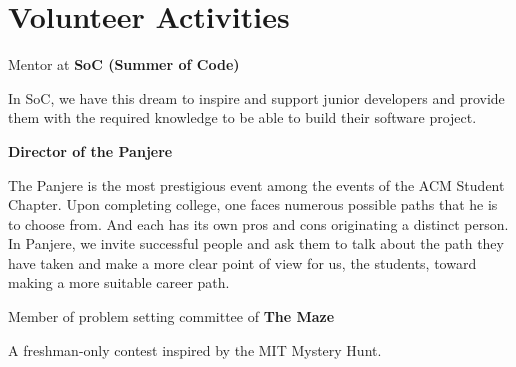 \documentclass[letterpaper]{article}
\renewenvironment{itemize}{
  \begin{list}{}{
    \setlength{\leftmargin}{1.5em}
  }
}{
  \end{list}
}
\begin{document}
\section*{Volunteer Activities}
\begin{itemize}
    \item \begin{samepage}\hspace*{10pt} Mentor at \textbf{SoC (Summer of Code)}
            \begin{description}[style=nextline,noitemsep,topsep=0pt]
                \item {\hspace*{10pt} In SoC, we have this dream to inspire and support junior developers and provide them with the required knowledge to be able to build their software project.}
            \end{description}
        \end{samepage}
    \item \begin{samepage} \hspace*{10pt} \textbf{Director of the  Panjere}
            \begin{description}[style=nextline,noitemsep,topsep=0pt]
                \item {\hspace*{10pt} The Panjere is the most prestigious event among the events of the ACM Student Chapter. Upon completing college, one faces numerous possible paths that he is to choose from. And each has its own pros and cons originating a distinct person. In Panjere, we invite successful people and ask them to talk about the path they have taken and make a more clear point of view for us, the students, toward making a more suitable career path.}
            \end{description}
        \end{samepage}
    \item \begin{samepage}\hspace*{10pt} Member of problem setting committee of \textbf{The Maze}
            \begin{description}[style=nextline,noitemsep,topsep=0pt]
                \item {\hspace*{10pt} A freshman-only contest inspired by the MIT Mystery Hunt.}
            \end{description}
        \end{samepage}

\end{itemize}
\end{document}
